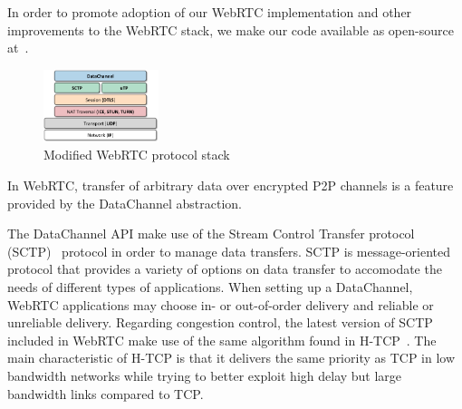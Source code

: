 \documentclass{sig-alternate}
\begin{document}
In order to promote adoption of our WebRTC implementation and other improvements to the
WebRTC stack, we make our code available as open-source at~\cite{webrtc-utp}.





\begin{figure}[t]
  \centering
    \includegraphics[width=0.30\textwidth]{figs/architecture3}
\vspace*{-0.38cm}
	\caption{Modified WebRTC protocol stack} \label{fig:architecture}
\vspace*{-0.4cm}
\end{figure}



In WebRTC, transfer of arbitrary data over encrypted P2P channels is a feature provided by
the DataChannel abstraction. 



The DataChannel API make use of the Stream Control Transfer protocol
(SCTP)~\cite{sctp-rfc} protocol in order to manage data transfers. SCTP is
message-oriented protocol that provides a variety of options on data transfer to
accomodate the needs of different types of applications. When setting up a DataChannel,
WebRTC applications may choose in- or out-of-order delivery and reliable or unreliable
delivery. Regarding congestion control, the latest version of SCTP included in WebRTC make
use of the same algorithm found in H-TCP~\cite{htcp}. The main characteristic of H-TCP is
that it delivers the same priority as TCP in low bandwidth networks while trying to better
exploit high delay but large bandwidth links compared to TCP.
\end{document}
